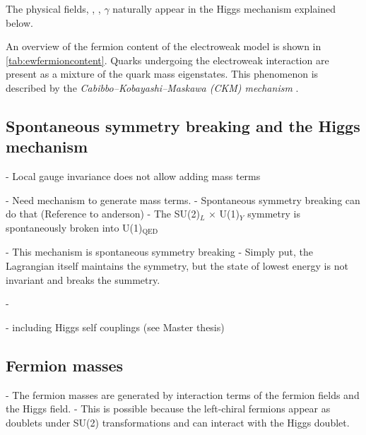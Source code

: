 The physical fields, \Wpm, \Zboson, $\gamma$ naturally appear in the Higgs mechanism explained below. 



An overview of the fermion content of the electroweak model is shown in \cref{tab:ewfermioncontent}. Quarks undergoing the electroweak interaction are present as a mixture of the quark mass eigenstates. This phenomenon is described by the \emph{Cabibbo–Kobayashi–Maskawa (CKM) mechanism} \cite{doi:10.1143/PTP.49.652}.









\subsection{Spontaneous symmetry breaking and the Higgs mechanism}
- Local gauge invariance does not allow adding mass terms 

- Need mechanism to generate mass terms.
- Spontaneous symmetry breaking can do that (Reference to anderson)
- The SU(2)$_L$ $\times$ U(1)$_Y$ symmetry is spontaneously broken into U(1)$_\text{QED}$

- This mechanism is spontaneous symmetry breaking
- Simply put, the Lagrangian itself maintains the symmetry, but the state of lowest energy is not invariant and breaks the summetry. 

- 





- including Higgs self couplings (see Master thesis)



\subsection{Fermion masses}
- The fermion masses are generated by interaction terms of the fermion fields and the Higgs field.
- This is possible because the left-chiral fermions appear as doublets under SU(2) transformations and can interact with the Higgs doublet.


